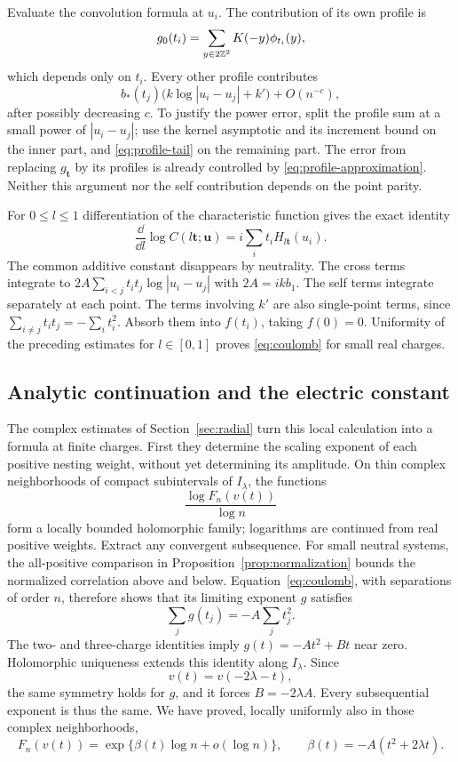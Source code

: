 Evaluate the convolution formula at $u_i$.  The contribution of its
own profile is
\[
 g_0(t_i)=\sum_{y\in2\mathbb Z^2}K(-y)\phi_{t_i}(y),
\]
which depends only on $t_i$.  Every other profile contributes
\[
 b_*(t_j)\bigl(k\log|u_i-u_j|+k'\bigr)
       +O(n^{-c}),
\]
after possibly decreasing $c$.  To justify the power error, split the
profile sum at a small power of $|u_i-u_j|$; use the kernel asymptotic
and its increment bound on the inner part, and
\eqref{eq:profile-tail} on the remaining part.  The error from replacing
$g_{\mathbf t}$ by its profiles is already controlled by
\eqref{eq:profile-approximation}.  Neither this argument nor the
self contribution depends on the point parity.

For $0\le l\le1$ differentiation of the characteristic function gives
the exact identity
\[
 \frac{\dd}{\dd l}\log C(l\mathbf t;\mathbf u)
       =i\sum_i t_iH_{l\mathbf t}(u_i).
\]
The common additive constant disappears by neutrality.  The cross
terms integrate to
$2A\sum_{i<j}t_it_j\log|u_i-u_j|$ with $2A=ikb_1$.
The self terms integrate separately at each point.  The terms involving
$k'$ are also single-point terms, since
$\sum_{i\ne j}t_it_j=-\sum_i t_i^2$.
Absorb them into $f(t_i)$, taking $f(0)=0$.
Uniformity of the preceding estimates for $l\in[0,1]$ proves
\eqref{eq:coulomb} for small real charges.

\subsection{Analytic continuation and the electric constant}

The complex estimates of Section~\ref{sec:radial} turn this local
calculation into a formula at finite charges.  First they determine
the scaling exponent of each positive nesting weight, without yet
determining its amplitude.  On thin complex neighborhoods of compact
subintervals of $I_\lambda$, the functions
\[
 \frac{\log F_n(v(t))}{\log n}
\]
form a locally bounded holomorphic family; logarithms are continued
from real positive weights.  Extract any convergent subsequence.
For small neutral systems, the all-positive comparison in
Proposition~\ref{prop:normalization} bounds the normalized correlation
above and below.  Equation~\eqref{eq:coulomb}, with separations of
order $n$, therefore shows that its limiting exponent $g$ satisfies
\[
 \sum_j g(t_j)=-A\sum_jt_j^2.
\]
The two- and three-charge identities imply
$g(t)=-At^2+Bt$ near zero.  Holomorphic uniqueness extends this identity
along $I_\lambda$.  Since
\[
 v(t)=v(-2\lambda-t),
\]
the same symmetry holds for $g$, and it forces $B=-2\lambda A$.
Every subsequential exponent is thus the same.  We have proved,
locally uniformly also in those complex neighborhoods,
\begin{equation}\label{eq:nest-log-exponent}
 F_n(v(t))=\exp\{\beta(t)\log n+o(\log n)\},
 \qquad \beta(t)=-A(t^2+2\lambda t).
\end{equation}

